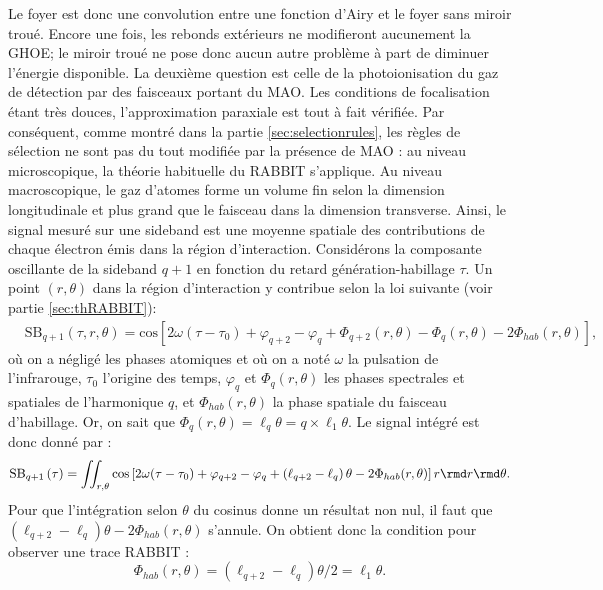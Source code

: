 Le foyer est donc une convolution entre une fonction d'Airy et le foyer sans miroir troué. Encore une fois, les rebonds extérieurs ne modifieront aucunement la GHOE; le miroir troué ne pose donc aucun autre problème à part de diminuer l'énergie disponible.
La deuxième question est celle de la photoionisation du gaz de détection par des faisceaux portant du MAO. Les conditions de focalisation étant très douces, l'approximation paraxiale est tout à fait vérifiée. Par conséquent, comme montré dans la partie \ref{sec:selectionrules}, les règles de sélection ne sont pas du tout modifiée par la présence de MAO : au niveau microscopique, la théorie habituelle du RABBIT s'applique. Au niveau macroscopique, le gaz d'atomes forme un volume fin selon la dimension longitudinale et plus grand que le faisceau dans la dimension transverse. Ainsi, le signal mesuré sur une sideband est une moyenne spatiale des contributions de chaque électron émis dans la région d'interaction. Considérons la composante oscillante de la sideband $q+1$ en fonction du retard génération-habillage $\tau$. Un point $(r,\theta)$ dans la région d'interaction y contribue selon la loi suivante (voir partie \ref{sec:thRABBIT}):
\begin{align*}
  & \text{S}{{\text{B}}_{q+1}}\left( \tau ,r,\theta  \right)=\text{cos}\left[ 2\omega {\left(\tau-{\tau }_{0}\right)}+{{\varphi }_{q+2}}-{{\varphi }_{q}}+{{\Phi }_{q+2}}\left( r,\theta  \right)-{{\Phi }_{q}}\left( r,\theta  \right)-2{{\Phi }_{hab}}(r,\theta ) \right],
\end{align*}
où on a négligé les phases atomiques et où on a noté $\omega$ la pulsation de l'infrarouge, $\tau_0$ l'origine des temps, $\varphi_q$ et $\Phi_q(r,\theta)$ les phases spectrales et spatiales de l'harmonique $q$, et ${\Phi }_{hab}(r,\theta)$ la phase spatiale du faisceau d'habillage. Or, on sait que $\Phi_q(r,\theta)=\ell_q\theta = q\times\ell_1\theta$. Le signal intégré est donc donné par :
\begin{equation*}
\text{S}{{\text{B}}_{q+1}}\left(\tau\right)=\iint_{r,\theta}{\text{cos}\left[ 2\omega {\left(\tau-{\tau }_{0}\right)}+{{\varphi }_{q+2}}-{{\varphi }_{q}}+\left(\ell_{q+2}-\ell_q\right)\theta-2{{\Phi }_{hab}}(r,\theta ) \right]r\rmd r \rmd \theta}.
\end{equation*}
Pour que l'intégration selon $\theta$ du cosinus donne un résultat non nul, il faut que $\left(\ell_{q+2}-\ell_q\right)\theta-2{{\Phi }_{hab}}(r,\theta )$ s'annule. On obtient donc la condition pour observer une trace RABBIT : 
\begin{equation*}
{\Phi }_{hab}(r,\theta )=\left(\ell_{q+2}-\ell_q\right)\theta/2=\ell_1\theta.
\end{equation*}
